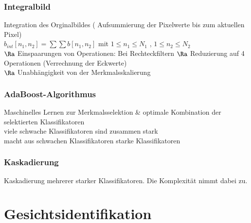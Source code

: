 \documentclass[6pt,a4paper]{scrartcl}
\begin{document}
\begin{multicols}{4}
{\subsubsection{Integralbild}
Integration des Orginalbildes ( Aufsummierung der Pixelwerte bis zum aktuellen Pixel)\\
$b_{int}[n_1,n_2] = \sum \sum b[n_1,n_2]$ mit $1\le n_1 \le  N_1$ , $1 \le n_2 \le N_2$ \\
$\Ra$ Einspaarungen von Operationen: Bei Rechteckfiltern $\Ra$ Reduzierung auf 4 Operationen (Verrechnung der Eckwerte)\\
$\Ra$ Unabhängigkeit von der Merkmalsskalierung\\


\subsubsection{AdaBoost-Algorithmus}
Maschinelles Lernen zur Merkmalsselektion \& optimale Kombination der selektierten Klassifikatoren \\
viele schwache Klassifikatoren sind zusammen stark\\
macht aus schwachen Klassifikatoren starke Klassifikatoren

\subsubsection{Kaskadierung}
Kaskadierung mehrerer starker Klassifikatoren. Die Komplexität nimmt dabei zu.
}

\vfill
\columnbreak

\section{Gesichtsidentifikation}


\end{multicols}
\end{document}

